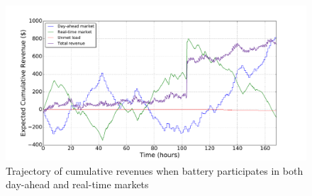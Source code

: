 \documentclass[11pt,twoside]{article}
\begin{document}
\begin{figure}[h!]
\begin{center}
\includegraphics[scale=0.4]{Figures/Plots/fullproblem_stoch/cumulative_rev_fp_st.pdf} \caption{Trajectory of cumulative revenues when battery participates in both day-ahead and real-time markets}\label{fig:cumulative_rev_fp_st}\end{center}
\end{figure}
\end{document}
